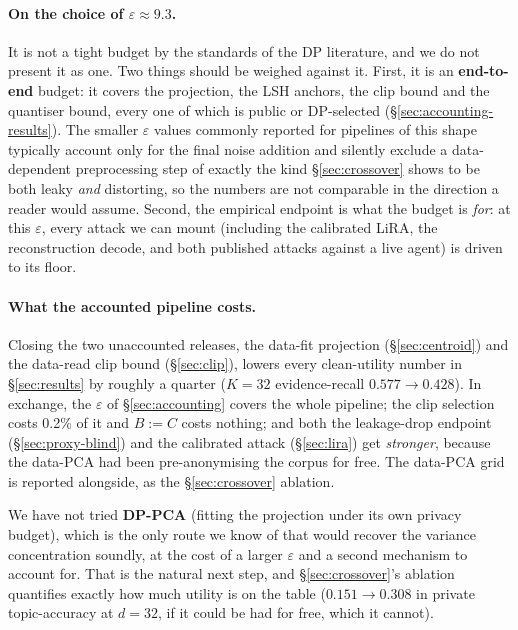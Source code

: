 \documentclass[pdflatex,sn-mathphys-num,12pt]{sn-jnl}
\theoremstyle{thmstyleone}%
\theoremstyle{thmstyletwo}%
\theoremstyle{thmstylethree}%
\newcommand{\eps}{\varepsilon}
\newcommand{\secref}[1]{\S\ref{#1}}
\begin{document}
\paragraph{On the choice of $\eps \approx 9.3$.} It is not a tight budget by the standards of the
DP literature, and we do not present it as one. Two things should be weighed against it. First, it is
an \textbf{end-to-end} budget: it covers the projection, the LSH anchors, the clip bound and the
quantiser bound, every one of which is public or DP-selected (\secref{sec:accounting-results}). The
smaller $\eps$ values commonly reported for pipelines of this shape typically account only for the
final noise addition and silently exclude a data-dependent preprocessing step of exactly the kind
\secref{sec:crossover} shows to be both leaky \emph{and} distorting, so the numbers are not
comparable in the direction a reader would assume. Second, the empirical endpoint is what the budget
is \emph{for}: at this $\eps$, every attack we can mount (including the calibrated LiRA, the
reconstruction decode, and both published attacks against a live agent) is driven to its floor.

\paragraph{What the accounted pipeline costs.} Closing the two unaccounted releases, the
data-fit projection (\secref{sec:centroid}) and the data-read clip bound (\secref{sec:clip}),
lowers every clean-utility number in \secref{sec:results} by roughly a quarter ($K = 32$
evidence-recall $0.577 \to 0.428$). In exchange, the $\eps$ of \secref{sec:accounting} covers the
whole pipeline; the clip selection costs 0.2\% of it and $B := C$ costs nothing; and both the
leakage-drop endpoint (\secref{sec:proxy-blind}) and the calibrated attack (\secref{sec:lira}) get
\emph{stronger}, because the data-PCA had been pre-anonymising the corpus for free. The data-PCA
grid is reported alongside, as the \secref{sec:crossover} ablation.

We have not tried \textbf{DP-PCA} (fitting the projection under its own privacy budget), which is
the only route we know of that would recover the variance concentration soundly, at the cost of a
larger $\eps$ and a second mechanism to account for. That is the natural next step, and
\secref{sec:crossover}'s ablation quantifies exactly how much utility is on the table
($0.151 \to 0.308$ in private topic-accuracy at $d = 32$, if it could be had for free, which it
cannot).
\end{document}
